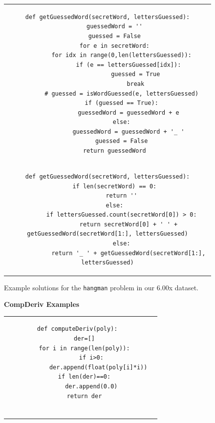 \documentclass[12pt,twoside]{mitthesis}
\newcommand \codevar[1]{\texttt{#1}}
\begin{document}
{{{{{{{{{{\begin{figure}
\begin{tabular}{c}
\begin{minipage}{1.0\linewidth}
\begin{lstlisting}[]
def getGuessedWord(secretWord, lettersGuessed):
    guessedWord = ''
    guessed = False
    for e in secretWord:
        for idx in range(0,len(lettersGuessed)):
            if (e == lettersGuessed[idx]):
                guessed = True
                break
        # guessed = isWordGuessed(e, lettersGuessed)
        if (guessed == True):
            guessedWord = guessedWord + e
        else:
            guessedWord = guessedWord + '_ '
        guessed = False
    return guessedWord
\end{lstlisting}
\end{minipage}
\\
\begin{minipage}{1.0\linewidth}
\begin{lstlisting}[]
def getGuessedWord(secretWord, lettersGuessed):
    if len(secretWord) == 0:
        return ''
    else:
        if lettersGuessed.count(secretWord[0]) > 0:
            return secretWord[0] + ' ' + getGuessedWord(secretWord[1:], lettersGuessed)
        else:
            return '_ ' + getGuessedWord(secretWord[1:], lettersGuessed)
\end{lstlisting}
\end{minipage}
\end{tabular}
\caption{Example solutions for the \codevar{hangman} problem in our 6.00x dataset.}
\label{hmexamples}
\end{figure}
\begin{figure}
{\bf CompDeriv Examples}\\
\begin{tabular}{cc} 
\begin{minipage}{0.5\linewidth}
\begin{lstlisting}[]
def computeDeriv(poly):
    der=[]
    for i in range(len(poly)):
        if i>0:
            der.append(float(poly[i]*i))
    if len(der)==0:
        der.append(0.0)
    return der


\end{lstlisting}
\end{minipage}
\end{tabular}
\end{figure}}}}}}}}}}}
\end{document}
